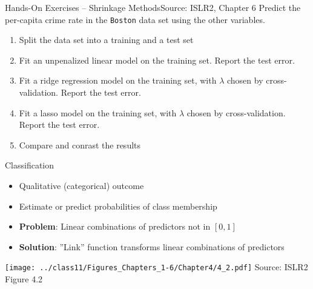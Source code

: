 \documentclass[ignorenonframetext,xcolor=x11names]{beamer}
\begin{document}
\begin{frame}{Hands-On Exercises -- Shrinkage Methods}{Source: ISLR2, Chapter 6}
Predict the per-capita crime rate in the \texttt{Boston} data set using the other variables.
  \begin{enumerate}
      \item Split the data set into a training and a test set
      \item Fit an unpenalized linear model on the training set. Report the test error.
      \item Fit a ridge regression model on the training set, with $\lambda$ chosen by cross-validation. Report the test error.
      \item Fit a lasso model on the training set, with $\lambda$ chosen by cross-validation. Report the test error.
      \item Compare and conrast the results
  \end{enumerate}
\end{frame}


\begin{frame}{Classification}
  \begin{itemize}
     \item Qualitative (categorical) outcome
     \item Estimate or predict probabilities of class membership
     \item \textbf{Problem}: Linear combinations of predictors not in $[0, 1]$
     \item \textbf{Solution}: ''Link'' function transforms linear combinations of predictors
  \end{itemize}
\texttt{[image: ../class11/Figures\_Chapters\_1-6/Chapter4/4\_2.pdf]}
\scriptsize Source: ISLR2 Figure 4.2
\end{frame}
\end{document}
